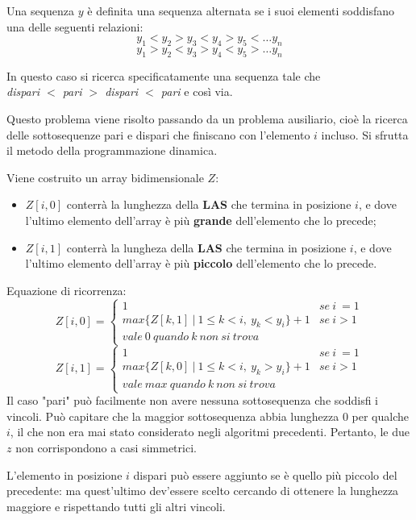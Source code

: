 Una sequenza $y$ è definita una sequenza alternata se i suoi elementi soddisfano una delle seguenti relazioni:
$$y_1 < y_2 > y_3 < y_4 > y_5 < \dots y_n$$
$$y_1 > y_2 < y_3 > y_4 < y_5 > \dots y_n$$

In questo caso si ricerca specificatamente una sequenza tale che \\
\textit{dispari $<$ pari $>$ dispari $<$ pari} e così via.

Questo problema viene risolto passando da un problema ausiliario, cioè la ricerca delle sottosequenze pari e dispari che finiscano con l'elemento $i$ incluso. Si sfrutta il metodo della programmazione dinamica.

Viene costruito un array bidimensionale $Z$: \begin{itemize}
	\item $Z[i, 0]$ conterrà la lunghezza della \textbf{LAS} che termina in posizione $i$, e dove l'ultimo elemento dell'array è più \textbf{grande} dell'elemento che lo precede;
	\item $Z[i, 1]$ conterrà la lungheza della \textbf{LAS} che termina in posizione $i$, e dove l'ultimo elemento dell'array è più \textbf{piccolo} dell'elemento che lo precede.
\end{itemize}

Equazione di ricorrenza:
$$Z[i, 0] = \begin{cases}
1 & se\ i\ = 1 \\
max\{Z[k, 1]\ |\ 1 \leq k < i,\ y_k < y_i\} + 1 & se\ i > 1 \\
vale\ 0\ quando\ k\ non\ si\ trova
\end{cases}$$
$$Z[i, 1] = \begin{cases}
1 & se\ i\ = 1 \\
max\{Z[k, 0]\ |\ 1 \leq k < i,\ y_k > y_i\} + 1 & se\ i > 1 \\
vale\ max\ quando\ k\ non\ si\ trova
\end{cases}$$
Il caso "pari" può facilmente non avere nessuna sottosequenza che soddisfi i vincoli. Può capitare che la maggior sottosequenza abbia lunghezza 0 per qualche $i$, il che non era mai stato considerato negli algoritmi precedenti. Pertanto, le due $z$ non corrispondono a casi simmetrici.

L'elemento in posizione $i$ dispari può essere aggiunto se è quello più piccolo del precedente: ma quest'ultimo dev'essere scelto cercando di ottenere la lunghezza maggiore e rispettando tutti gli altri vincoli. 

